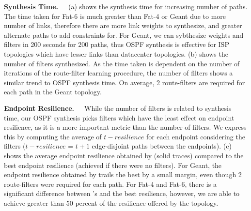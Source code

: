 \noindent\textbf{Synthesis Time.}~~~(a) 
shows the synthesis time for increasing number of paths. 
The time taken for Fat-6 is much greater than Fat-4 or Geant
due to more number of links, therefore there are more link weights
to synthesize, and greater alternate paths to add constraints for. 
For Geant, we can sybthesize weights and filters in 200 seconds 
for 200 paths, thus OSPF synthesis is effective for ISP topologies
which have lesser links than datacenter topologies. 
(b) shows the number of filters synthesized. 
As the time taken is dependent on the number of iterations of
the route-filter learning procedure, the number of filters
shows a similar trend to OSPF synthesis time. On average, 2 route-filters
are required for each path in the Geant topology. 

\noindent\textbf{Endpoint Resilience.}~~~While the number of 
filters is related to synthesis time, our OSPF synthesis picks
filters which have the least effect on endpoint resilience, as it  
is a more important metric than the number of filters. We express this
by computing the average of $t-resilience$ for each endpoint considering
the filters ($t-resilience$ = $t+1$ edge-disjoint paths between the 
endpoints).
(c) shows the average
endpoint resilience obtained by \name (solid traces) 
compared to the best endpoint resilience (achieved
if there were no filters). For Geant, the endpoint 
resilience obtained by \name trails the best by a small margin,
even though 2 route-filters were required for each path. For
Fat-4 and Fat-6, there is a significant difference between \name's 
and the best resilience, however, we are able to achieve greater than
50 percent of the resilience offered by the topology. 